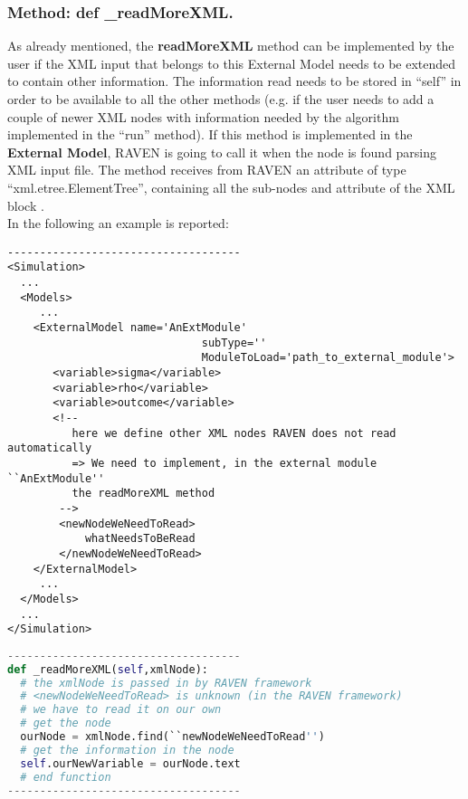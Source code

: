\subsubsection{Method: def \_readMoreXML.}
\label{subsubsec:externalReadMoreXML}
As already mentioned, the \textbf{readMoreXML} method can be implemented by the
user if the XML input that belongs to this External Model needs to be extended
to contain other information.
%
The information read needs to be stored in ``self'' in order to be available to
all the other methods (e.g. if the user needs to add a couple of newer XML nodes
with information needed by the algorithm implemented in the ``run'' method).
%
If this method is implemented in the \textbf{External Model}, RAVEN is going to
call it when the node  is found parsing XML input file.
%
The method receives from RAVEN an attribute of type ``xml.etree.ElementTree'',
containing all the sub-nodes and attribute of the XML block .
%
\\In the following an example is reported:
\begin{lstlisting}[style=XML]
------------------------------------
<Simulation>
  ...
  <Models>
     ...
    <ExternalModel name='AnExtModule'
                              subType=''
                              ModuleToLoad='path_to_external_module'>
       <variable>sigma</variable>
       <variable>rho</variable>
       <variable>outcome</variable>
       <!--
          here we define other XML nodes RAVEN does not read automatically
          => We need to implement, in the external module ``AnExtModule''
          the readMoreXML method
        -->
        <newNodeWeNeedToRead>
            whatNeedsToBeRead
        </newNodeWeNeedToRead>
    </ExternalModel>
     ...
  </Models>
  ...
</Simulation>
\end{lstlisting}
\begin{lstlisting}[language=python]
------------------------------------
def _readMoreXML(self,xmlNode):
  # the xmlNode is passed in by RAVEN framework
  # <newNodeWeNeedToRead> is unknown (in the RAVEN framework)
  # we have to read it on our own
  # get the node
  ourNode = xmlNode.find(``newNodeWeNeedToRead'')
  # get the information in the node
  self.ourNewVariable = ourNode.text
  # end function
------------------------------------
\end{lstlisting}
